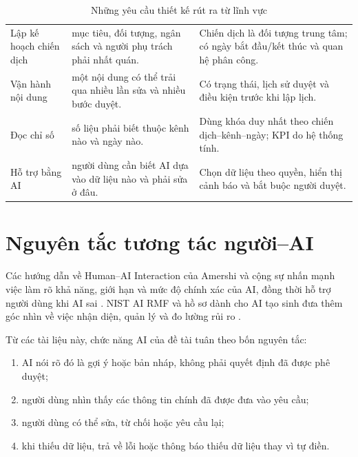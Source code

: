 \begin{table}[h!]
\centering
\small
\caption{Những yêu cầu thiết kế rút ra từ lĩnh vực}
\label{tab:v8-domain-drivers}
\begin{tabularx}{\textwidth}{|L{3.4cm}|Y|Y|}
\hline
{} &  & \\
\hline
Lập kế hoạch chiến dịch & mục tiêu, đối tượng, ngân sách và người phụ trách phải nhất quán. & Chiến dịch là đối tượng trung tâm; có ngày bắt đầu/kết thúc và quan hệ phân công.\\
\hline
Vận hành nội dung & một nội dung có thể trải qua nhiều lần sửa và nhiều bước duyệt. & Có trạng thái, lịch sử duyệt và điều kiện trước khi lập lịch.\\
\hline
Đọc chỉ số & số liệu phải biết thuộc kênh nào và ngày nào. & Dùng khóa duy nhất theo chiến dịch--kênh--ngày; KPI do hệ thống tính.\\
\hline
Hỗ trợ bằng AI & người dùng cần biết AI dựa vào dữ liệu nào và phải sửa ở đâu. & Chọn dữ liệu theo quyền, hiển thị cảnh báo và bắt buộc người duyệt.\\
\hline
\end{tabularx}
\end{table}

\section{Nguyên tắc tương tác người--AI}

Các hướng dẫn về Human--AI Interaction của Amershi và cộng sự nhấn mạnh việc làm rõ khả năng, giới hạn và mức độ chính xác của AI, đồng thời hỗ trợ người dùng khi AI sai \cite{amershi2019hax}. NIST AI RMF và hồ sơ dành cho AI tạo sinh đưa thêm góc nhìn về việc nhận diện, quản lý và đo lường rủi ro \cite{nist-airmf,nist-genai-profile}.

Từ các tài liệu này, chức năng AI của đề tài tuân theo bốn nguyên tắc:

\begin{enumerate}
\item AI nói rõ đó là gợi ý hoặc bản nháp, không phải quyết định đã được phê duyệt;
\item người dùng nhìn thấy các thông tin chính đã được đưa vào yêu cầu;
\item người dùng có thể sửa, từ chối hoặc yêu cầu lại;
\item khi thiếu dữ liệu, trả về lỗi hoặc thông báo thiếu dữ liệu thay vì tự điền.
\end{enumerate}

